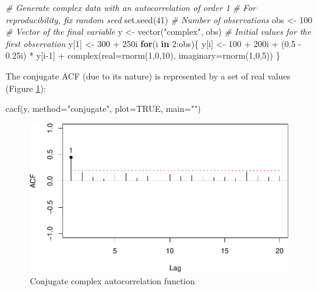 \documentclass[
]{book}
\newenvironment{Shaded}{\begin{snugshade}}{\end{snugshade}}
\newcommand{\AttributeTok}[1]{\textcolor[rgb]{0.77,0.63,0.00}{#1}}
\newcommand{\CommentTok}[1]{\textcolor[rgb]{0.56,0.35,0.01}{\textit{#1}}}
\newcommand{\ConstantTok}[1]{\textcolor[rgb]{0.00,0.00,0.00}{#1}}
\newcommand{\ControlFlowTok}[1]{\textcolor[rgb]{0.13,0.29,0.53}{\textbf{#1}}}
\newcommand{\DecValTok}[1]{\textcolor[rgb]{0.00,0.00,0.81}{#1}}
\newcommand{\FloatTok}[1]{\textcolor[rgb]{0.00,0.00,0.81}{#1}}
\newcommand{\FunctionTok}[1]{\textcolor[rgb]{0.00,0.00,0.00}{#1}}
\newcommand{\NormalTok}[1]{#1}
\newcommand{\OtherTok}[1]{\textcolor[rgb]{0.56,0.35,0.01}{#1}}
\newcommand{\SpecialCharTok}[1]{\textcolor[rgb]{0.00,0.00,0.00}{#1}}
\newcommand{\StringTok}[1]{\textcolor[rgb]{0.31,0.60,0.02}{#1}}
\begin{document}
\begin{Shaded}
\begin{Highlighting}[]
\CommentTok{\# Generate complex data with an autocorrelation of order 1}
\CommentTok{\# For reproducibility, fix random seed}
\FunctionTok{set.seed}\NormalTok{(}\DecValTok{41}\NormalTok{)}
\CommentTok{\# Number of observations}
\NormalTok{obs }\OtherTok{\textless{}{-}} \DecValTok{100}
\CommentTok{\# Vector of the final variable}
\NormalTok{y }\OtherTok{\textless{}{-}} \FunctionTok{vector}\NormalTok{(}\StringTok{"complex"}\NormalTok{, obs)}
\CommentTok{\# Initial values for the first observation}
\NormalTok{y[}\DecValTok{1}\NormalTok{] }\OtherTok{\textless{}{-}} \DecValTok{300} \SpecialCharTok{+}\NormalTok{ 250i}
\ControlFlowTok{for}\NormalTok{(i }\ControlFlowTok{in} \DecValTok{2}\SpecialCharTok{:}\NormalTok{obs)\{}
\NormalTok{    y[i] }\OtherTok{\textless{}{-}} \DecValTok{100} \SpecialCharTok{+}\NormalTok{ 200i }\SpecialCharTok{+}\NormalTok{ (}\FloatTok{0.5} \SpecialCharTok{{-}} \FloatTok{0.25}\NormalTok{i) }\SpecialCharTok{*}\NormalTok{ y[i}\DecValTok{{-}1}\NormalTok{] }\SpecialCharTok{+}
        \FunctionTok{complex}\NormalTok{(}\AttributeTok{real=}\FunctionTok{rnorm}\NormalTok{(}\DecValTok{1}\NormalTok{,}\DecValTok{0}\NormalTok{,}\DecValTok{10}\NormalTok{), }\AttributeTok{imaginary=}\FunctionTok{rnorm}\NormalTok{(}\DecValTok{1}\NormalTok{,}\DecValTok{0}\NormalTok{,}\DecValTok{5}\NormalTok{))}
\NormalTok{\}}
\end{Highlighting}
\end{Shaded}

The conjugate ACF (due to its nature) is represented by a set of real values (Figure \ref{fig:complexAR1ACFConj}):

\begin{Shaded}
\begin{Highlighting}[]
\FunctionTok{cacf}\NormalTok{(y, }\AttributeTok{method=}\StringTok{"conjugate"}\NormalTok{, }\AttributeTok{plot=}\ConstantTok{TRUE}\NormalTok{, }\AttributeTok{main=}\StringTok{""}\NormalTok{)}
\end{Highlighting}
\end{Shaded}

\begin{figure}
\centering
\includegraphics{Svetunkov---Svetunkov---Complex-Valued-Econometrics_files/figure-latex/complexAR1ACFConj-1.pdf}
\caption{\label{fig:complexAR1ACFConj}Conjugate complex autocorrelation function}
\end{figure}
\end{document}
